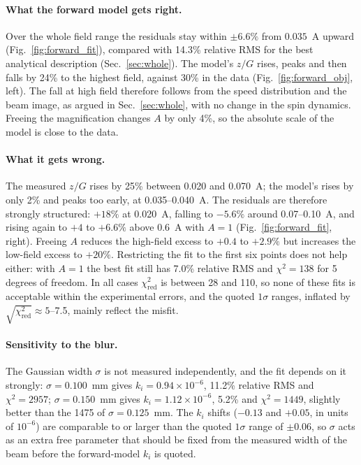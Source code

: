\documentclass[11pt,a4paper]{article}
\newcommand{\kan}{k_i}
\begin{document}
\paragraph{What the forward model gets right.} Over the whole field range the residuals stay within $\pm6.6\%$ from $0.035$~A upward (Fig.~\ref{fig:forward_fit}), compared with 14.3\% relative RMS for the best analytical description (Sec.~\ref{sec:whole}). The model's $z/G$ rises, peaks and then falls by 24\% to the highest field, against 30\% in the data (Fig.~\ref{fig:forward_obj}, left). The fall at high field therefore follows from the speed distribution and the beam image, as argued in Sec.~\ref{sec:whole}, with no change in the spin dynamics. Freeing the magnification changes $A$ by only 4\%, so the absolute scale of the model is close to the data.

\paragraph{What it gets wrong.} The measured $z/G$ rises by 25\% between 0.020 and 0.070~A; the model's rises by only 2\% and peaks too early, at 0.035--0.040~A. The residuals are therefore strongly structured: $+18\%$ at 0.020~A, falling to $-5.6\%$ around 0.07--0.10~A, and rising again to $+4$ to $+6.6\%$ above 0.6~A with $A=1$ (Fig.~\ref{fig:forward_fit}, right). Freeing $A$ reduces the high-field excess to $+0.4$ to $+2.9\%$ but increases the low-field excess to $+20\%$. Restricting the fit to the first six points does not help either: with $A=1$ the best fit still has 7.0\% relative RMS and $\chi^2 = 138$ for 5 degrees of freedom. In all cases $\chi^2_\text{red}$ is between 28 and 110, so none of these fits is acceptable within the experimental errors, and the quoted $1\sigma$ ranges, inflated by $\sqrt{\chi^2_\text{red}}\approx5$--7.5, mainly reflect the misfit.

\paragraph{Sensitivity to the blur.} The Gaussian width $\sigma$ is not measured independently, and the fit depends on it strongly: $\sigma = 0.100$~mm gives $\kan = 0.94\times10^{-6}$, 11.2\% relative RMS and $\chi^2 = 2957$; $\sigma = 0.150$~mm gives $\kan = 1.12\times10^{-6}$, 5.2\% and $\chi^2 = 1449$, slightly better than the 1475 of $\sigma = 0.125$~mm. The $\kan$ shifts ($-0.13$ and $+0.05$, in units of $10^{-6}$) are comparable to or larger than the quoted $1\sigma$ range of $\pm0.06$, so $\sigma$ acts as an extra free parameter that should be fixed from the measured width of the beam before the forward-model $\kan$ is quoted.
\end{document}
